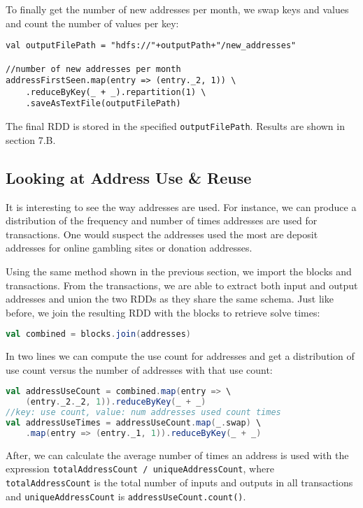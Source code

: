 \documentclass[9pt,twocolumn,twoside]{idsi}
\begin{document}
To finally get the number of new addresses per month, we swap keys and values and count the number of values per key:

\begin{lstlisting}
val outputFilePath = "hdfs://"+outputPath+"/new_addresses"

//number of new addresses per month
addressFirstSeen.map(entry => (entry._2, 1)) \
    .reduceByKey(_ + _).repartition(1) \
    .saveAsTextFile(outputFilePath)
\end{lstlisting}

The final RDD is stored in the specified \lstinline{outputFilePath}. Results are shown in section 7.B.

\subsection{Looking at Address Use \& Reuse}
It is interesting to see the way addresses are used. For instance, we can produce a distribution of the frequency and number of times addresses are used for transactions. One would suspect the addresses used the most are deposit addresses for online gambling sites or donation addresses.

Using the same method shown in the previous section, we import the blocks and transactions. From the transactions, we are able to extract both input and output addresses and union the two RDDs as they share the same schema. Just like before, we join the resulting RDD with the blocks to retrieve solve times:

\begin{lstlisting}[language=Scala]
val combined = blocks.join(addresses)
\end{lstlisting}

In two lines we can compute the use count for addresses and get a distribution of use count versus the number of addresses with that use count:

\begin{lstlisting}[language=Scala]
val addressUseCount = combined.map(entry => \
    (entry._2._2, 1)).reduceByKey(_ + _)
//key: use count, value: num addresses used count times
val addressUseTimes = addressUseCount.map(_.swap) \
    .map(entry => (entry._1, 1)).reduceByKey(_ + _)
\end{lstlisting}

After, we can calculate the average number of times an address is used with the expression \lstinline{totalAddressCount / uniqueAddressCount}, where \lstinline{totalAddressCount} is the total number of inputs and outputs in all transactions and \lstinline{uniqueAddressCount} is \lstinline{addressUseCount.count()}.
\end{document}
